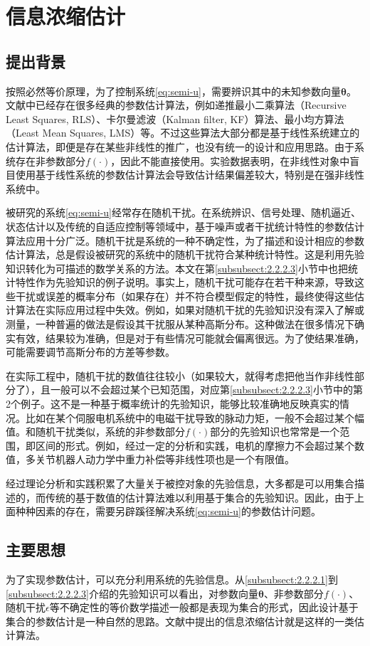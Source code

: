 \section{信息浓缩估计}\label{sect:2.3}
\subsection{提出背景}\label{subsect:2.3.1}
按照必然等价原理，为了控制系统\eqref{eq:semi-u}，需要辨识其中的未知参数向量$\bm{\theta}$。文献中已经存在很多经典的参数估计算法，例如递推最小二乘算法（Recursive Least Squares, RLS）、卡尔曼滤波（Kalman filter, KF）算法、最小均方算法（Least Mean Squares, LMS）等。不过这些算法大部分都是基于线性系统建立的估计算法，即便是存在某些非线性的推广，也没有统一的设计和应用思路。由于系统存在非参数部分$f(\cdot)$，因此不能直接使用。实验数据表明，在非线性对象中盲目使用基于线性系统的参数估计算法会导致估计结果偏差较大，特别是在强非线性系统中。

被研究的系统\eqref{eq:semi-u}经常存在随机干扰。在系统辨识、信号处理、随机逼近、状态估计以及传统的自适应控制等领域中，基于噪声或者干扰统计特性的参数估计算法应用十分广泛。随机干扰是系统的一种不确定性，为了描述和设计相应的参数估计算法，总是假设被研究的系统中的随机干扰符合某种统计特性。这是利用先验知识转化为可描述的数学关系的方法。本文在第\ref{subsubsect:2.2.2.3}小节中也把统计特性作为先验知识的例子说明。事实上，随机干扰可能存在若干种来源，导致这些干扰或误差的概率分布（如果存在）并不符合模型假定的特性，最终使得这些估计算法在实际应用过程中失效。例如，如果对随机干扰的先验知识没有深入了解或测量，一种普遍的做法是假设其干扰服从某种高斯分布。这种做法在很多情况下确实有效，结果较为准确，但是对于有些情况可能就会偏离很远。为了使结果准确，可能需要调节高斯分布的方差等参数。

在实际工程中，随机干扰的数值往往较小（如果较大，就得考虑把他当作非线性部分了），且一般可以不会超过某个已知范围，对应第\ref{subsubsect:2.2.2.3}小节中的第2个例子。这不是一种基于概率统计的先验知识，能够比较准确地反映真实的情况。比如在某个伺服电机系统中的电磁干扰导致的脉动力矩，一般不会超过某个幅值。和随机干扰类似，系统的非参数部分$f(\cdot)$部分的先验知识也常常是一个范围，即区间的形式。例如，经过一定的分析和实践，电机的摩擦力不会超过某个数值，多关节机器人动力学中重力补偿等非线性项也是一个有限值。

经过理论分析和实践积累了大量关于被控对象的先验信息，大多都是可以用集合描述的，而传统的基于数值的估计算法难以利用基于集合的先验知识。因此，由于上面种种因素的存在，需要另辟蹊径解决系统\eqref{eq:semi-u}的参数估计问题。
\subsection{主要思想}\label{subsect:2.3.2}
为了实现参数估计，可以充分利用系统的先验信息。从\ref{subsubsect:2.2.2.1}到\ref{subsubsect:2.2.2.3}介绍的先验知识可以看出，对参数向量$\bm{\theta}$、非参数部分$f(\cdot)$、随机干扰$\epsilon$等不确定性的等价数学描述一般都是表现为集合的形式，因此设计基于集合的参数估计是一种自然的思路。文献\cite{MaLum2009}中提出的信息浓缩估计就是这样的一类估计算法。

